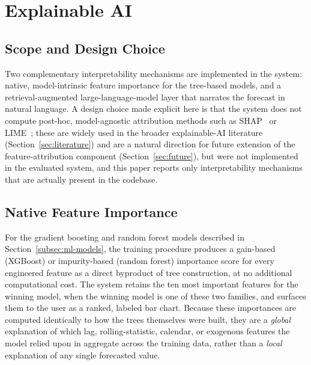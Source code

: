 \section{Explainable AI}
\label{sec:xai}

\subsection{Scope and Design Choice}
Two complementary interpretability mechanisms are implemented in the system: native, model-intrinsic feature importance for the tree-based models, and a retrieval-augmented large-language-model layer that narrates the forecast in natural language. A design choice made explicit here is that the system does not compute post-hoc, model-agnostic attribution methods such as SHAP~\cite{lundberg2017shap} or LIME~\cite{ribeiro2016lime}; these are widely used in the broader explainable-AI literature (Section~\ref{sec:literature}) and are a natural direction for future extension of the feature-attribution component (Section~\ref{sec:future}), but were not implemented in the evaluated system, and this paper reports only interpretability mechanisms that are actually present in the codebase.

\subsection{Native Feature Importance}
For the gradient boosting and random forest models described in Section~\ref{subsec:ml-models}, the training procedure produces a gain-based (XGBoost) or impurity-based (random forest) importance score for every engineered feature as a direct byproduct of tree construction, at no additional computational cost. The system retains the ten most important features for the winning model, when the winning model is one of these two families, and surfaces them to the user as a ranked, labeled bar chart. Because these importances are computed identically to how the trees themselves were built, they are a \emph{global} explanation of which lag, rolling-statistic, calendar, or exogenous features the model relied upon in aggregate across the training data, rather than a \emph{local} explanation of any single forecasted value.

